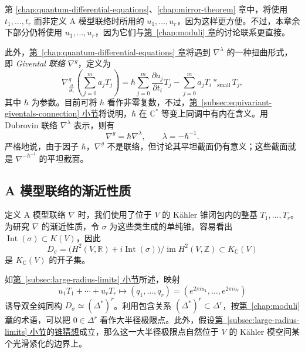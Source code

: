 第 \hyperref[chap:quantum-differential-equations]{\ref*{chap:quantum-differential-equations}}、\hyperref[chap:mirror-theorem]{\ref*{chap:mirror-theorem}} 章中，将使用 $t_1,\ldots,t_r$ 而非定义 A 模型联络时所用的 $u_1,\ldots,u_r$，因为这样更方便。不过，本章余下部分仍将使用 $u_1,\ldots,u_r$，因为它们与\hyperref[chap:moduli]{第~\ref*{chap:moduli} 章}的讨论联系更直接。

此外，\hyperref[chap:quantum-differential-equations]{第~\ref*{chap:quantum-differential-equations} 章}将遇到 $\nabla^\lambda$ 的一种扭曲形式，即 \emph{Givental 联络} $\nabla^g$，定义为
\[
\nabla^g_{\frac{\partial}{\partial t_i}}\left(\sum_{j=0}^ma_jT_j\right)
=\hbar\sum_{j=0}^m\frac{\partial a_j}{\partial t_i}T_j
-\sum_{j=0}^ma_jT_i*_{\mathrm{small}}T_j,
\]
其中 $\hbar$ 为参数。目前可将 $\hbar$ 看作非零复数，不过，\hyperref[subsec:equivariant-giventals-connection]{第~\ref*{subsec:equivariant-giventals-connection} 小节}将说明，$\hbar$ 在 $\mathbb C^*$ 等变上同调中有内在含义。用 Dubrovin 联络 $\nabla^\lambda$ 表示，则有
\[
\nabla^g=\hbar\nabla^\lambda,\qquad\lambda=-\hbar^{-1}.
\]
严格地说，由于因子 $\hbar$，$\nabla^g$ 不是联络，但讨论其平坦截面仍有意义；这些截面就是 $\nabla^{-\hbar^{-1}}$ 的平坦截面。

\hypertarget{source:268-batch6}{}
\subsection{A 模型联络的渐近性质}\label{subsec:a-model-asymptotics}
定义 A 模型联络 $\nabla$ 时，我们使用了位于 $V$ 的 Kähler 锥闭包内的整基 $T_1,\ldots,T_r$。为研究 $\nabla$ 的渐近性质，令 $\sigma$ 为这些类生成的单纯锥。容易看出 $\operatorname{Int}(\sigma)\subset K(V)$，因此
\[
D_\sigma=\bigl(H^2(V,\mathbb R)+i\operatorname{Int}(\sigma)\bigr)/\operatorname{im}H^2(V,\mathbb Z)\subset K_{\mathbb C}(V)
\]
是 $K_{\mathbb C}(V)$ 的开子集。

如\hyperref[subsec:large-radius-limits]{第~\ref*{subsec:large-radius-limits} 小节}所述，映射
\[
u_1T_1+\cdots+u_rT_r\longmapsto(q_1,\ldots,q_r)=(e^{2\pi iu_1},\ldots,e^{2\pi iu_r})
\]
诱导双全纯同构 $D_\sigma\simeq(\Delta^*)^r$。利用包含关系 $(\Delta^*)^r\subset\Delta^r$，按\hyperref[chap:moduli]{第~\ref*{chap:moduli} 章}的术语，可以把 $0\in\Delta^r$ 看作大半径极限点。此外，假设\hyperref[subsec:large-radius-limits]{第~\ref*{subsec:large-radius-limits} 小节}的\hyperref[conj:kahler-cone]{锥猜想}成立，那么这一大半径极限点自然位于 $V$ 的 Kähler 模空间某个光滑紧化的边界上。

